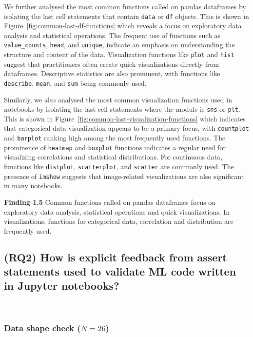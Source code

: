 \documentclass[smallextended]{svjour3}       %
\newcommand{\highlight}[1]{\begin{framed}%
  \noindent#1
\end{framed}}
\begin{document}
We further analysed the most common functions called on pandas dataframes by isolating the last cell statements that contain \lstinline{data} or \lstinline{df} objects. This is shown in Figure~\ref{fig:common-last-df-functions} which reveals a focus on exploratory data analysis and statistical operations. The frequent use of functions such as \lstinline{value_counts}, \lstinline{head}, and \lstinline{unique}, indicate an emphasis on understanding the structure and content of the data. Visualization functions like \lstinline{plot} and \lstinline{hist} suggest that practitioners often create quick visualizations directly from dataframes. Descriptive statistics are also prominent, with functions like \lstinline{describe}, \lstinline{mean}, and \lstinline{sum} being commonly used.

Similarly, we also analysed the most common visualization functions used in notebooks by isolating the last cell statements where the module is \lstinline{sns} or \lstinline{plt}. This is shown in Figure~\ref{fig:common-last-visualization-functions} which indicates that categorical data visualization appears to be a primary focus, with \lstinline{countplot} and \lstinline{barplot} ranking high among the most frequently used functions. The prominence of \lstinline{heatmap} and \lstinline{boxplot} functions indicates a regular need for visualizing correlations and statistical distributions. For continuous data, functions like \lstinline{distplot}, \lstinline{scatterplot}, and \lstinline{scatter} are commonly used. The presence of \lstinline{imshow} suggests that image-related visualizations are also significant in many notebooks.

\highlight{\textbf{Finding 1.5} Common functions called on pandas dataframes focus on exploratory data analysis, statistical operations and quick visualizations. In visualizations, functions for categorical data, correlation and distribution are frequently used.}

\subsection{(RQ2) How is explicit feedback from assert statements used to validate ML code written in Jupyter notebooks?}~\label{sec:result-explicit}

\subsubsection{Data shape check ($N = 26$)}
\end{document}
